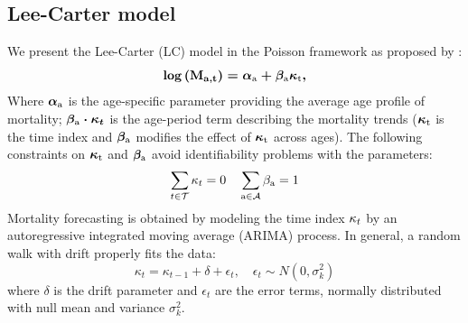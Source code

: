 \documentclass[a4,11pt]{article}
\begin{document}
\subsection{Lee-Carter model}
	We present the Lee-Carter (LC) model in the Poisson framework as proposed by \cite{BDV2002}:
	\begin{equation} 
	\label{eq:}
	\log{\left(\mathbf{M}_{\mathbf{a,t}}\right)}=\boldmath{\alpha}_{\text{a}}+\boldmath{\beta}_{\text{a}}\boldmath{\kappa}_{\text{t}}, 
	\end{equation}
	Where $\boldmath{\alpha}_{\text{a}}$ is the age-specific parameter providing the average age profile of mortality; $\boldmath{\beta}_{\text{a}}\cdot \boldmath{\kappa}_{t}$ is the age-period term describing the mortality trends ($\boldmath{\kappa}_{\text{t}}$ is the time index 
	and $\boldmath{\beta}_{\text{a}}$ modifies the effect of $\boldmath{\kappa}_{\text{t}}$ across ages).
	The following constraints on $\boldmath{\kappa}_{\text{t}}$ and $\boldmath{\beta}_{\text{a}}$ avoid identifiability problems with the parameters:
	$$\sum_{t \in \mathcal{T}}{\boldmath{\kappa}_{t}}=0 \quad \sum_{\text{a} \in \mathcal{A}}{\beta_\text{a}}=1$$
	Mortality forecasting is obtained by modeling the time index $\boldmath{\kappa_{t}}$ by an autoregressive integrated moving average (ARIMA) process. In general, a random walk with drift properly fits the data: 
	\begin{equation} 
	\label{eq:}
	\kappa_{t} = \kappa_{t-1} + \delta + \epsilon_t, \quad \epsilon_t \sim N(0, \sigma^{2}_k)
	\end{equation}
	where $\delta$ is the drift parameter and $\epsilon_t$ are the error terms, normally distributed with null mean and variance $\sigma^{2}_k$.
\end{document}
